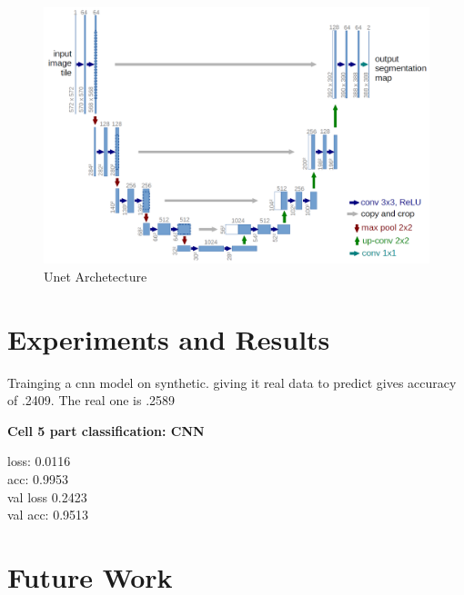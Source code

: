 \documentclass[ms,electronic,oneside,twosidetoc,letterpaper,chaptercenter,parttop]{byumsphd}
\begin{document}
\begin{figure}[H]
  \centering
  \includegraphics[width=.75\textwidth]{unet}
  \caption{Unet Archetecture}
\end{figure}

\chapter{Experiments and Results}

Trainging a cnn model on synthetic. giving it real data to predict gives
accuracy of .2409. The real one is .2589

\textbf{Cell 5 part classification: CNN}

loss: 0.0116 \\
acc: 0.9953 \\
val loss 0.2423 \\
val acc: 0.9513

\chapter{Future Work}



\end{document}
